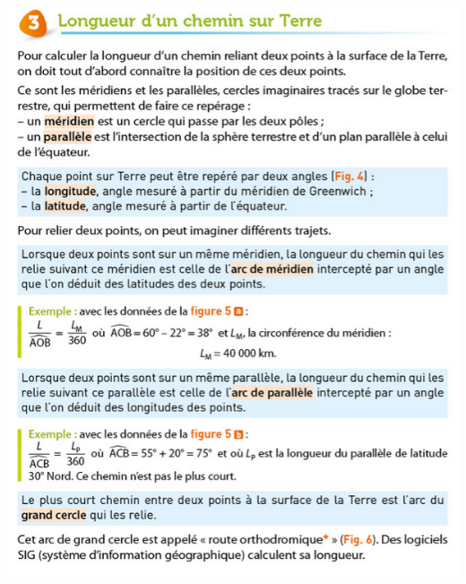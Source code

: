 \documentclass[10pt]{article}
\newcommand{\myscale}{0.55}
\begin{document}
\begin{center}
	\begin{minipage}[c]{0.6\textwidth}
		\centering
		\includegraphics[scale=\myscale]{assets/3.png}
	\end{minipage}
	\hspace{0.05\textwidth}
	\begin{minipage}[c]{0.34\textwidth}

\end{minipage}
\end{center}
\end{document}
